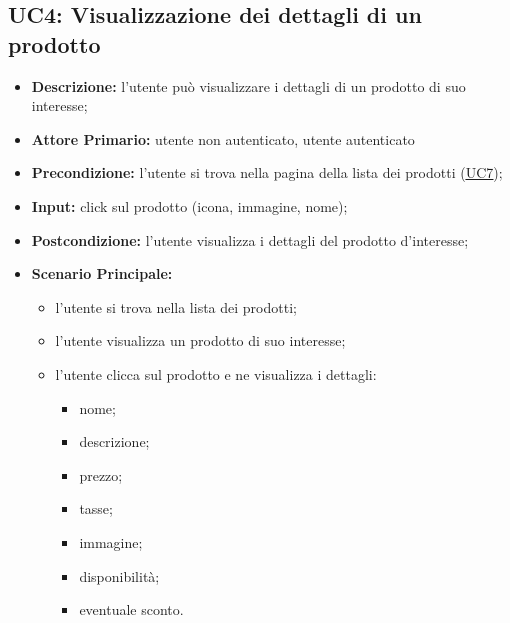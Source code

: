 \subsection{UC4: Visualizzazione dei dettagli di un prodotto }
\label{sec:UC4}
\begin{itemize}
    \item \textbf{Descrizione:} l'utente può visualizzare i dettagli di un prodotto di suo interesse;
    \item \textbf{Attore Primario:} utente non autenticato, utente autenticato
    \item \textbf{Precondizione:} l'utente si trova nella pagina della lista dei prodotti (\hyperref[sec:UC7]{\underline{UC7}});
    \item \textbf{Input:} click sul prodotto (icona, immagine, nome);
    \item \textbf{Postcondizione:} l'utente visualizza i dettagli del prodotto d'interesse;
    \item \textbf{Scenario Principale:}
          \begin{itemize}
              \item l'utente si trova nella lista dei prodotti;
              \item l'utente visualizza un prodotto di suo interesse;
              \item l'utente clicca sul prodotto e ne visualizza i dettagli:
                    \begin{itemize}
                        \item nome;
                        \item descrizione;
                        \item prezzo;
                        \item tasse;
                        \item immagine;
                        \item disponibilità;
                        \item eventuale sconto.
                    \end{itemize}
          \end{itemize}
\end{itemize}